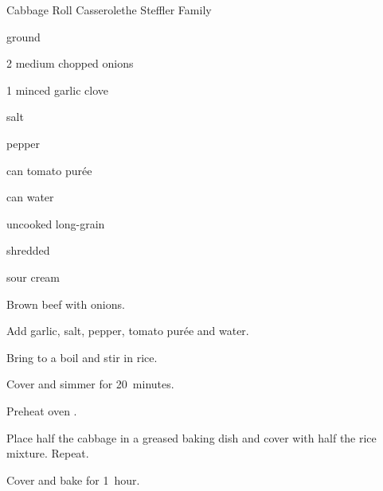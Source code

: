 \begin{recipe}{Cabbage Roll Casserole}{the Steffler Family}{}

\begin{ingredients}
\item \lbs{1\half} ground 
\item 2 medium chopped onions
\item 1 minced garlic clove
\item {} salt
\item \tp{\quarter} pepper
\item {} can tomato pur\'ee
\item {} can water
\item \C{\half} uncooked long-grain 
\item {} shredded 
\item sour cream
\end{ingredients}

\begin{directions}
\item Brown beef with onions.
\item Add garlic, salt, pepper, tomato pur\'ee and water.
\item Bring to a boil and stir in rice.
\item Cover and simmer for 20~minutes.
\item Preheat oven .
\item Place half the cabbage in a greased baking dish and cover with half the rice mixture. Repeat.
\item Cover and bake for 1~hour.
\end{directions}

\end{recipe}
